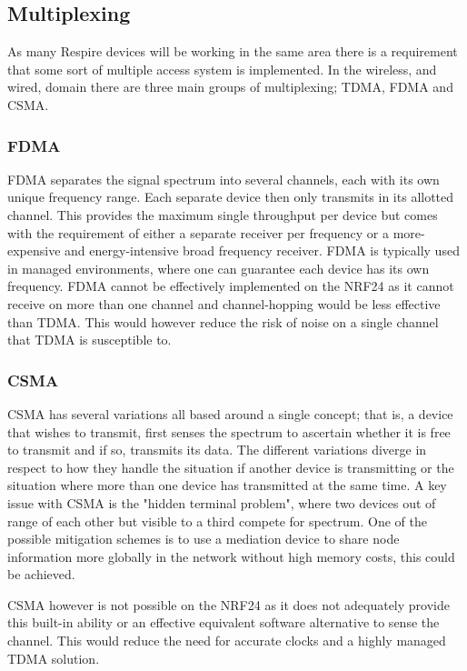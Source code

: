 \subsection{Multiplexing}
As many Respire devices will be working in the same area there is a requirement that some sort of
multiple access system is implemented. In the wireless, and wired, domain there are three main
groups of multiplexing; \ac{TDMA}, \ac{FDMA} and \ac{CSMA}.

\subsubsection{\acf{FDMA}}
FDMA separates the signal spectrum into several channels, each with its own unique frequency
range. Each separate device then only transmits in its allotted channel. This provides the maximum
single throughput per device but comes with the requirement of either a separate receiver per
frequency or a more-expensive and energy-intensive broad frequency receiver. \ac{FDMA} is typically
used in managed environments, where one can guarantee each device has its own frequency.
\ac{FDMA} cannot be effectively implemented on the \ac{NRF24} as it cannot receive on more than one
channel and channel-hopping would be less effective than \ac{TDMA}. This would however reduce the
risk of noise on a single channel that \ac{TDMA} is susceptible to.

\subsubsection{\acf{CSMA}}
\ac{CSMA} has several variations all based around a single concept; that is, a device that wishes to
transmit, first senses the spectrum to ascertain whether it is free to transmit and if so, transmits its
data. The different variations diverge in respect to how they handle the situation if another device is
transmitting or the situation where more than one device has transmitted at the same time.
A key issue with \ac{CSMA} is the "hidden terminal problem", where two devices out of range of each
other but visible to a third compete for spectrum. One of the possible mitigation schemes is to use a
mediation device to share node information more globally in the network without high memory
costs, this could be achieved.


\ac{CSMA} however is not possible on the \ac{NRF24} as it does not adequately provide this built-in
ability or an effective equivalent software alternative to sense the channel. This would reduce the
need for accurate clocks and a highly managed \ac{TDMA} solution.


